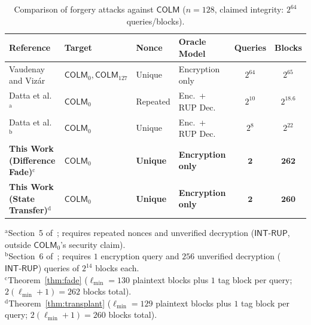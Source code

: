 \documentclass[11pt,a4paper]{article}
\theoremstyle{definition}
\theoremstyle{remark}
\newcommand{\COLM}{\mathsf{COLM}}
\newcommand{\COLMzero}{\mathsf{COLM}_0}
\newcommand{\COLMott}{\mathsf{COLM}_{127}}
\begin{document}
\begin{itemize}[leftmargin=2em]
\end{itemize}

\begin{table}[t]
\centering
\caption{Comparison of forgery attacks against $\COLM$ ($n = 128$, claimed integrity: $2^{64}$ queries/blocks).}
\label{tab:comparison}
\small
\setlength{\tabcolsep}{0pt}
\begin{tabular*}{\textwidth}{@{\extracolsep{\fill}}llllcc@{}}
\toprule
\textbf{Reference} & \textbf{Target} & \textbf{Nonce} & \textbf{Oracle Model} & \textbf{Queries} & \textbf{Blocks} \\
\midrule
Vaudenay and Viz\'{a}r~\cite{VV17} & $\COLMzero, \COLMott$ & Unique & Encryption only & $2^{64}$ & $2^{65}$ \\
Datta et al.~\cite{DLMN17}$^{\mathrm{a}}$ & $\COLMzero$ & Repeated & Enc.\ + RUP Dec. & $2^{10}$ & $2^{18.6}$ \\
Datta et al.~\cite{DLMN17}$^{\mathrm{b}}$ & $\COLMzero$ & Unique & Enc.\ + RUP Dec. & $2^{8}$ & $2^{22}$ \\
\midrule
\textbf{This Work (Difference Fade)}$^{\mathrm{c}}$ & $\COLMzero$ & \textbf{Unique} & \textbf{Encryption only} & $\mathbf{2}$ & $\mathbf{262}$ \\
\textbf{This Work (State Transfer)}$^{\mathrm{d}}$ & $\COLMzero$ & \textbf{Unique} & \textbf{Encryption only} & $\mathbf{2}$ & $\mathbf{260}$ \\
\bottomrule
\end{tabular*}
\vspace{3pt}
\parbox{\textwidth}{\footnotesize
$^{\mathrm{a}}$Section~5 of~\cite{DLMN17}; requires repeated nonces and unverified decryption ($\mathsf{INT\text{-}RUP}$, outside $\COLMzero$'s security claim).\\
$^{\mathrm{b}}$Section~6 of~\cite{DLMN17}; requires $1$ encryption query and $256$ unverified decryption ($\mathsf{INT\text{-}RUP}$) queries of $2^{14}$ blocks each.\\
$^{\mathrm{c}}$Theorem~\ref{thm:fade} ($\ell_{\min} = 130$ plaintext blocks plus $1$ tag block per query; $2(\ell_{\min}+1) = 262$ blocks total).\\
$^{\mathrm{d}}$Theorem~\ref{thm:transplant} ($\ell_{\min} = 129$ plaintext blocks plus $1$ tag block per query; $2(\ell_{\min}+1) = 260$ blocks total).}
\end{table}
\end{document}
